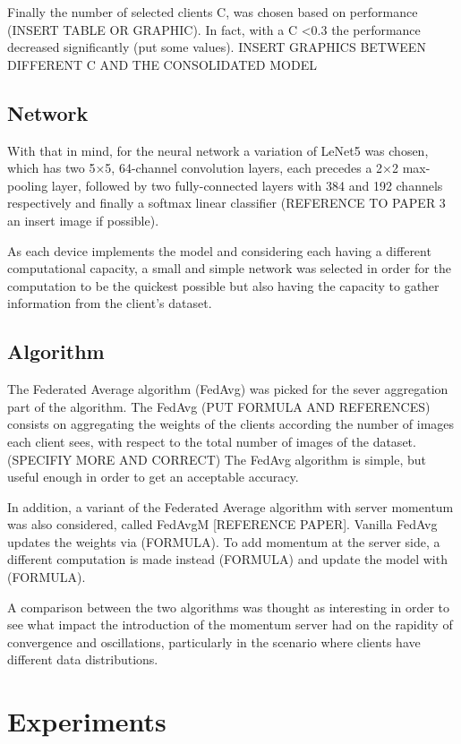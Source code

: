 \documentclass[twocolumn]{article}
\begin{document}
Finally the number of selected clients C, was chosen based on performance (INSERT TABLE OR GRAPHIC). In fact, with a C <0.3 the performance decreased significantly (put some values).
INSERT GRAPHICS BETWEEN DIFFERENT C AND THE CONSOLIDATED MODEL

\subsection{Network}

With that in mind, for the neural network a variation of LeNet5 was chosen, which has two 5×5, 64-channel convolution layers, each precedes a 2×2 max-pooling layer, followed by two fully-connected layers with 384 and 192 channels respectively and finally a softmax linear classifier (REFERENCE TO PAPER 3 an insert image if possible). 

As each device implements the model and considering each having a different computational capacity, a small and simple network was selected in order for the computation to be the quickest possible but also having the capacity to gather information from the client's dataset.

\subsection{Algorithm}
The Federated Average algorithm (FedAvg) was picked for the sever aggregation part of the algorithm. The FedAvg (PUT FORMULA AND REFERENCES) consists on aggregating the weights of the clients according the number of images each client sees, with respect to the total number of images of the dataset.(SPECIFIY MORE AND CORRECT)
The FedAvg algorithm is simple, but useful enough in order to get an acceptable accuracy.

In addition, a variant of the Federated Average algorithm with server momentum was also considered, called FedAvgM [REFERENCE PAPER]. Vanilla FedAvg updates the weights via (FORMULA). To add momentum at the server side, a different computation is made instead (FORMULA) and update the model with (FORMULA). 

A comparison between the two algorithms was thought as interesting in order to see what impact the introduction of the momentum server had on the rapidity of convergence and oscillations, particularly in the scenario where clients have different data distributions.


\section{Experiments} %
\end{document}
